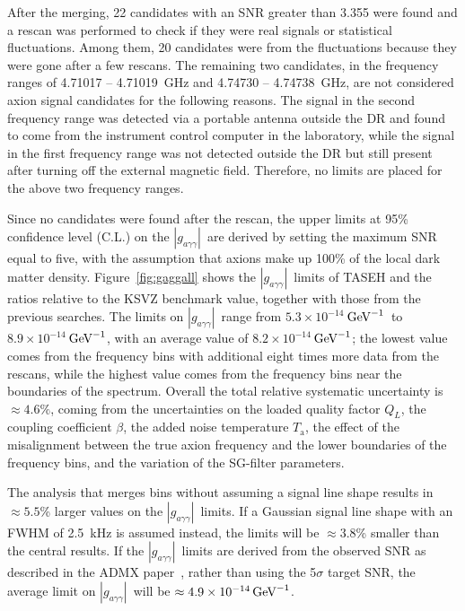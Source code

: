 \documentclass[%
 reprint,prl, %
superscriptaddress,
nobibnotes,
 amsmath,amssymb,
 aps,
]{revtex4-2}
\newcommand{\gagg}{\ensuremath{\left|g_{a\gamma\gamma}\right|}}
\newcommand{\ma}{\ensuremath{m_a}}
\newcommand{\ta}{\ensuremath{T_\text{a}}}
\newcommand{\muevcc}{\ensuremath{\,\mu\text{e\hspace{-.08em}V}}}
\newcommand{\GeVinv}{\ensuremath{\,\text{Ge\hspace{-.08em}V}^{-1}}}
\newcommand{\flo}{\ensuremath{4.70750}}
\newcommand{\fhi}{\ensuremath{4.79815}}
\newcommand{\mlo}{\ensuremath{19.4687}}
\newcommand{\mhi}{\ensuremath{19.8436}}
\newcommand{\avelimit}{\ensuremath{8.2\times 10^{-14}}} %
\newcommand{\ADMXavelimit}{\ensuremath{4.9\times 10^{-14}}}
\newcommand{\lolimit}{\ensuremath{5.3\times 10^{-14}}}
\newcommand{\hilimit}{\ensuremath{8.9\times 10^{-14}}}
\begin{document}
After the merging, 22 candidates with an SNR greater than 3.355 were found and 
a rescan was performed to check if they were real signals  
or statistical fluctuations.        
Among them, 20 candidates were from the fluctuations because they were gone 
after a few rescans. 
The remaining two candidates, in the frequency ranges of 
4.71017 -- 4.71019~GHz and 4.74730 -- 4.74738~GHz, are not 
considered axion signal candidates for the following reasons. 
The signal in the second frequency range was detected via a portable antenna 
outside the DR and found 
to come from the instrument control computer in the laboratory, while the 
signal in the first frequency range was not 
detected outside the DR but still present after 
turning off the external magnetic field. 
Therefore, no limits are placed for the above two frequency ranges.  

Since no candidates were found after the rescan, the upper limits 
at 95\% confidence level (C.L.) on the \gagg\ are derived by setting the 
maximum SNR equal to five, 
with the assumption that axions make up 100\% of the local dark matter 
density.  
Figure~\ref{fig:gaggall} shows the \gagg\ limits of TASEH and the 
ratios relative to the KSVZ benchmark value,  
 together with those from the previous searches. 
The limits on 
\gagg\ range from \lolimit\GeVinv\ to \hilimit\GeVinv, with an average 
value of \avelimit\GeVinv; the lowest value comes from the frequency bins with 
additional eight times more data from the rescans, while the highest value 
comes from the frequency bins near the boundaries of the spectrum. 
%
%
Overall the total relative systematic uncertainty is 
$\approx 4.6\%$, coming from the uncertainties on the loaded quality 
factor $Q_L$, the coupling coefficient $\beta$, the added noise temperature 
\ta, the effect of the misalignment between the true axion frequency and 
the lower boundaries of the frequency bins, and the variation of the 
SG-filter parameters. 


The analysis that merges bins without 
assuming a signal line shape results in $\approx5.5$\% larger values on the 
\gagg\ limits. If a Gaussian signal line shape with an FWHM of 2.5~kHz  
 is assumed instead, the limits will be $\approx3.8$\% smaller than the 
central results. If the \gagg\ limits are derived from the observed SNR as 
described in the ADMX paper~\cite{ADMXVIII}, 
rather than using the 5$\sigma$ target SNR, the average limit on \gagg\ will 
be $\approx\ADMXavelimit\GeVinv$. 
\end{document}
